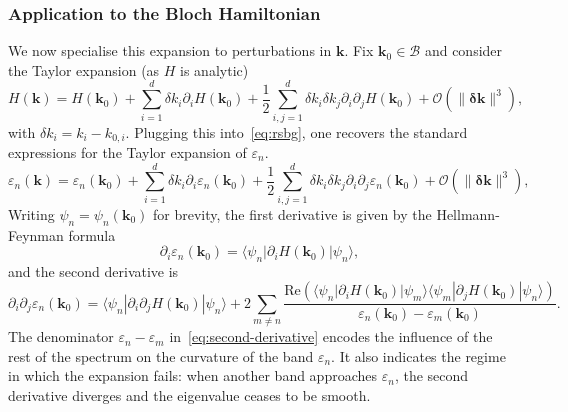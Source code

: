 \documentclass[11pt]{article}
\numberwithin{equation}{section}
\begin{document}
\subsubsection{Application to the Bloch Hamiltonian}

We now specialise this expansion to perturbations in \(\mathbf{k}\). Fix \(\mathbf{k}_0
\in \mathcal{B}\) and consider the Taylor expansion (as \(H\) is analytic)
\begin{equation}
    H(\mathbf{k}) = H(\mathbf{k}_0)
    + \sum_{i=1}^d \delta k_i \partial_i H(\mathbf{k}_0)
    + \frac{1}{2}\sum_{i,j=1}^d \delta k_i \delta k_j
    \partial_i\partial_j H(\mathbf{k}_0)
    + \mathcal{O}(\|\bm{\delta\mathbf{k}}\|^3),
\end{equation}
with \(\delta k_i = k_i - k_{0,i}\). Plugging this into~\eqref{eq:rsbg}, one recovers the
standard expressions for the Taylor expansion of \(\varepsilon_n\).
\begin{equation}
    \varepsilon_n(\mathbf{k}) = \varepsilon_n(\mathbf{k}_0)
    + \sum_{i=1}^d \delta k_i \partial_i \varepsilon_n(\mathbf{k}_0)
    + \frac{1}{2}\sum_{i,j=1}^d \delta k_i \delta k_j
    \partial_i\partial_j \varepsilon_n(\mathbf{k}_0)
    + \mathcal{O}(\|\bm{\delta\mathbf{k}}\|^3),
\end{equation}
Writing
\(\psi_n = \psi_n(\mathbf{k}_0)\) for brevity, the first derivative is given by the
Hellmann-Feynman formula
\begin{equation}
    \partial_i \varepsilon_n(\mathbf{k}_0)
    = \langle \psi_n | \partial_i H(\mathbf{k}_0) | \psi_n \rangle,
    \label{eq:hellmann-feynman}
\end{equation}
and the second derivative is
\begin{equation}
    \partial_i \partial_j \varepsilon_n(\mathbf{k}_0)
    = \langle \psi_n | \partial_i \partial_j H(\mathbf{k}_0) | \psi_n \rangle
    + 2 \sum_{m \neq n}
    \frac{\mathrm{Re}\left(\langle \psi_n | \partial_i H(\mathbf{k}_0) | \psi_m \rangle
        \langle \psi_m | \partial_j H(\mathbf{k}_0) | \psi_n \rangle\right)}
    {\varepsilon_n(\mathbf{k}_0) - \varepsilon_m(\mathbf{k}_0)}.
    \label{eq:second-derivative}
\end{equation}
The denominator \(\varepsilon_n - \varepsilon_m\) in~\eqref{eq:second-derivative} encodes
the influence of the rest of the spectrum on the curvature of the band \(\varepsilon_n\).
It also indicates the regime in which the expansion fails: when another band approaches
\(\varepsilon_n\), the second derivative diverges and the eigenvalue ceases to be smooth.
\end{document}
